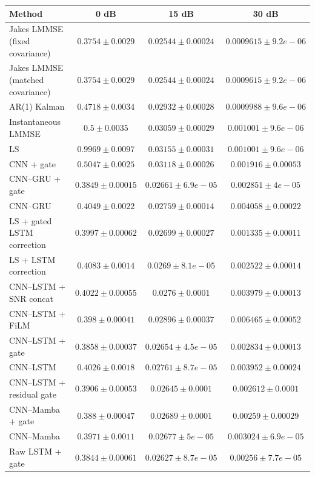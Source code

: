 \begin{tabular}{lccc}
\hline
Method & 0 dB & 15 dB & 30 dB \\
\hline
Jakes LMMSE (fixed covariance) & $0.3754 \pm 0.0029$ & $0.02544 \pm 0.00024$ & $0.0009615 \pm 9.2e-06$ \\
Jakes LMMSE (matched covariance) & $0.3754 \pm 0.0029$ & $0.02544 \pm 0.00024$ & $0.0009615 \pm 9.2e-06$ \\
AR(1) Kalman & $0.4718 \pm 0.0034$ & $0.02932 \pm 0.00028$ & $0.0009988 \pm 9.6e-06$ \\
Instantaneous LMMSE & $0.5 \pm 0.0035$ & $0.03059 \pm 0.00029$ & $0.001001 \pm 9.6e-06$ \\
LS & $0.9969 \pm 0.0097$ & $0.03155 \pm 0.00031$ & $0.001001 \pm 9.6e-06$ \\
CNN + gate & $0.5047 \pm 0.0025$ & $0.03118 \pm 0.00026$ & $0.001916 \pm 0.00053$ \\
CNN--GRU + gate & $0.3849 \pm 0.00015$ & $0.02661 \pm 6.9e-05$ & $0.002851 \pm 4e-05$ \\
CNN--GRU & $0.4049 \pm 0.0022$ & $0.02759 \pm 0.00014$ & $0.004058 \pm 0.00022$ \\
LS + gated LSTM correction & $0.3997 \pm 0.00062$ & $0.02699 \pm 0.00027$ & $0.001335 \pm 0.00011$ \\
LS + LSTM correction & $0.4083 \pm 0.0014$ & $0.0269 \pm 8.1e-05$ & $0.002522 \pm 0.00014$ \\
CNN--LSTM + SNR concat & $0.4022 \pm 0.00055$ & $0.0276 \pm 0.0001$ & $0.003979 \pm 0.00013$ \\
CNN--LSTM + FiLM & $0.398 \pm 0.00041$ & $0.02896 \pm 0.00037$ & $0.006465 \pm 0.00052$ \\
CNN--LSTM + gate & $0.3858 \pm 0.00037$ & $0.02654 \pm 4.5e-05$ & $0.002834 \pm 0.00013$ \\
CNN--LSTM & $0.4026 \pm 0.0018$ & $0.02761 \pm 8.7e-05$ & $0.003952 \pm 0.00024$ \\
CNN--LSTM + residual gate & $0.3906 \pm 0.00053$ & $0.02645 \pm 0.0001$ & $0.002612 \pm 0.0001$ \\
CNN--Mamba + gate & $0.388 \pm 0.00047$ & $0.02689 \pm 0.0001$ & $0.00259 \pm 0.00029$ \\
CNN--Mamba & $0.3971 \pm 0.0011$ & $0.02677 \pm 5e-05$ & $0.003024 \pm 6.9e-05$ \\
Raw LSTM + gate & $0.3844 \pm 0.00061$ & $0.02627 \pm 8.7e-05$ & $0.00256 \pm 7.7e-05$ \\
\hline
\end{tabular}
